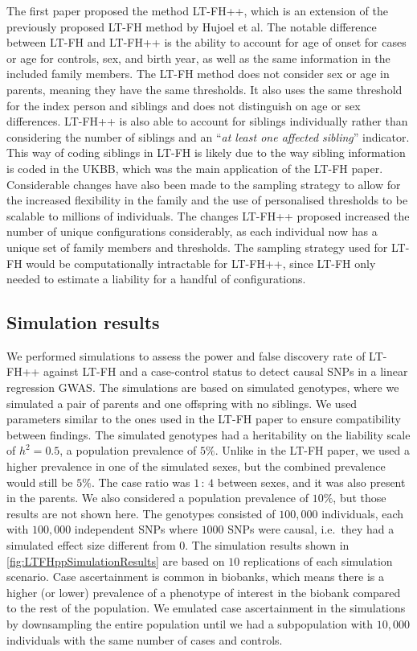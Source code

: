 The first paper proposed the method LT-FH++, which is an extension of the previously proposed LT-FH method by Hujoel et al\cite{hujoel2020liability}. The notable difference between LT-FH and LT-FH++ is the ability to account for age of onset for cases or age for controls, sex, and birth year, as well as the same information in the included family members. The LT-FH method does not consider sex or age in parents, meaning they have the same thresholds. It also uses the same threshold for the index person and siblings and does not distinguish on age or sex differences. LT-FH++ is also able to account for siblings individually rather than considering the number of siblings and an \enquote{\textit{at least one affected sibling}} indicator. This way of coding siblings in LT-FH is likely due to the way sibling information is coded in the UKBB, which was the main application of the LT-FH paper. Considerable changes have also been made to the sampling strategy to allow for the increased flexibility in the family and the use of personalised thresholds to be scalable to millions of individuals.  The changes LT-FH++ proposed increased the number of unique configurations considerably, as each individual now has a unique set of family members and thresholds. The sampling strategy used for LT-FH would be computationally intractable for LT-FH++, since LT-FH only needed to estimate a liability for a handful of configurations.


\subsection{Simulation results}
We performed simulations to assess the power and false discovery rate of LT-FH++ against LT-FH and a case-control status to detect causal SNPs in a linear regression GWAS. The simulations are based on simulated genotypes, where we simulated a pair of parents and one offspring with no siblings. We used parameters similar to the ones used in the LT-FH paper to ensure compatibility between findings. The simulated genotypes had a heritability on the liability scale of $ h^2 = 0.5 $, a population prevalence of $ 5\% $. Unlike in the LT-FH paper, we used a higher prevalence in one of the simulated sexes, but the combined prevalence would still be $ 5\% $. The case ratio was $ 1{\,:\,}4 $ between sexes, and it was also present in the parents. We also considered a population prevalence of $ 10\% $, but those results are not shown here. The genotypes consisted of $ 100,000 $ individuals, each with $ 100,000 $ independent SNPs where $ 1000 $ SNPs were causal, i.e.\ they had a simulated effect size different from $ 0 $. The simulation results shown in \cref{fig:LTFHppSimulationResults} are based on $ 10 $ replications of each simulation scenario. Case ascertainment is common in biobanks, which means there is a higher (or lower) prevalence of a phenotype of interest in the biobank compared to the rest of the population. We emulated case ascertainment in the simulations by downsampling the entire population until we had a subpopulation with $ 10,000 $ individuals with the same number of cases and controls.

